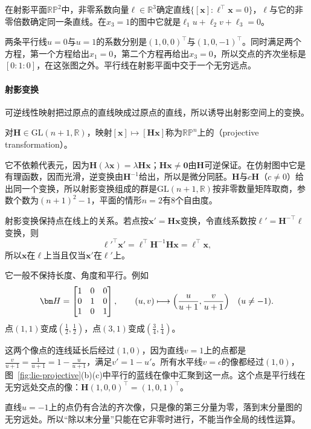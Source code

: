 在射影平面$\mathbb{RP}^2$中，非零系数向量$\bm\ell\in\mathbb R^3$确定直线$\{[\bm x]:\bm\ell^\top\bm x=0\}$，$\bm\ell$与它的非零倍数确定同一条直线。在$x_3=1$的图中它就是$\ell_1u+\ell_2v+\ell_3=0$。

两条平行线$u=0$与$u=1$的系数分别是$(1,0,0)^\top$与$(1,0,-1)^\top$。同时满足两个方程，第一个方程给出$x_1=0$，第二个方程再给出$x_3=0$，所以交点的齐次坐标是$[0:1:0]$，在这张图之外。平行线在射影平面中交于一个无穷远点。

\paragraph{射影变换}
可逆线性映射把过原点的直线映成过原点的直线，所以诱导出射影空间上的变换。

\begin{definition}[射影变换]
\label{def:lie-projective-transformation}
对$\bm H\in\mathrm{GL}(n+1,\mathbb R)$，映射$[\bm x]\mapsto[\bm H\bm x]$称为$\mathbb{RP}^n$上的（projective transformation）。
\end{definition}

它不依赖代表元，因为$\bm H(\lambda\bm x)=\lambda\bm H\bm x$；$\bm H\bm x\neq\bm0$由$\bm H$可逆保证。在仿射图中它是有理函数，因而光滑，逆变换由$\bm H^{-1}$给出，所以是微分同胚。$\bm H$与$c\bm H$（$c\neq0$）给出同一个变换，所以射影变换组成的群是$\mathrm{GL}(n+1,\mathbb R)$按非零数量矩阵取商，参数个数为$(n+1)^2-1$，平面的情形$n=2$有$8$个自由度。

射影变换保持点在线上的关系。若点按$\bm x'=\bm H\bm x$变换，令直线系数按$\bm\ell'=\bm H^{-\top}\bm\ell$变换，则
\[
\bm\ell'^\top\bm x'=\bm\ell^\top\bm H^{-1}\bm H\bm x=\bm\ell^\top\bm x,
\]
所以$\bm x$在$\bm\ell$上当且仅当$\bm x'$在$\bm\ell'$上。

它一般不保持长度、角度和平行。例如
\[
\bm H=\begin{bmatrix}1&0&0\\0&1&0\\1&0&1\end{bmatrix},\qquad
(u,v)\longmapsto\Bigl(\frac{u}{u+1},\frac{v}{u+1}\Bigr)\quad(u\neq-1).
\]
点$(1,1)$变成$(\frac12,\frac12)$，点$(3,1)$变成$(\frac34,\frac14)$。

这两个像点的连线延长后经过$(1,0)$，因为直线$v=1$上的点都是$\frac{v}{u+1}=\frac1{u+1}=1-\frac{u}{u+1}$，满足$v'=1-u'$。所有水平线$v=c$的像都经过$(1,0)$，图~\ref{fig:lie-projective}(b)(c)中平行的蓝线在像中汇聚到这一点。这个点是平行线在无穷远处交点的像：$\bm H(1,0,0)^\top=(1,0,1)^\top$。

直线$u=-1$上的点仍有合法的齐次像，只是像的第三分量为零，落到末分量图的无穷远处。所以“除以末分量”只能在它非零时进行，不能当作全局的线性运算。

